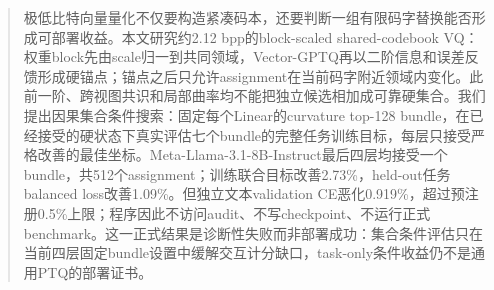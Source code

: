 \begin{abstract}
极低比特向量量化不仅要构造紧凑码本，还要判断一组有限码字替换能否形成可部署收益。本文研究约2.12 bpp的block-scaled shared-codebook VQ：权重block先由scale归一到共同领域，Vector-GPTQ再以二阶信息和误差反馈形成硬锚点；锚点之后只允许assignment在当前码字附近领域内变化。此前一阶、跨视图共识和局部曲率均不能把独立候选相加成可靠硬集合。我们提出因果集合条件搜索：固定每个Linear的curvature top-128 bundle，在已经接受的硬状态下真实评估七个bundle的完整任务训练目标，每层只接受严格改善的最佳坐标。Meta-Llama-3.1-8B-Instruct最后四层均接受一个bundle，共512个assignment；训练联合目标改善2.73\%，held-out任务balanced loss改善1.09\%。但独立文本validation CE恶化0.919\%，超过预注册0.5\%上限；程序因此不访问audit、不写checkpoint、不运行正式benchmark。这一正式结果是诊断性失败而非部署成功：集合条件评估只在当前四层固定bundle设置中缓解交互计分缺口，task-only条件收益仍不是通用PTQ的部署证书。
\end{abstract}
